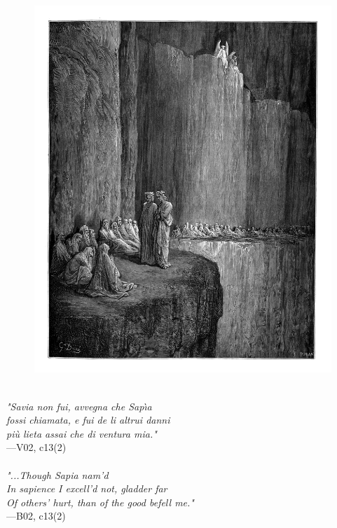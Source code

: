 \documentclass[../Dore_vision.tex]{subfiles}
\begin{document}
\begin{figure}[ht]
\centering
\includegraphics[height=\figsize]{illustrations/book_2/V02, c13(2).jpg}
\end{figure}

\begin{center}
\begin{minipage}{0.8\linewidth}
\textit{\\
"Savia non fui, avvegna che Sap\`{\i}a\\fossi chiamata, e fui de li altrui danni\\più lieta assai che di ventura mia."} \\
—V02, c13(2) \\~\\
\textit{"...Though Sapia nam'd\\In sapience I excell'd not, gladder far\\Of others' hurt, than of the good befell me."} \\
—B02, c13(2)
\end{minipage}
\end{center}
\end{document}
